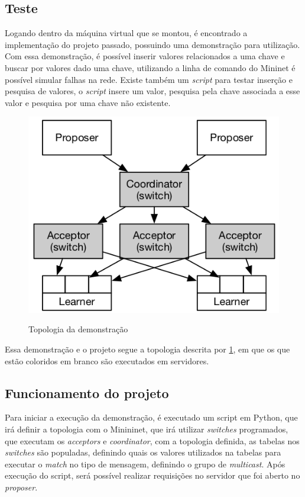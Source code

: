 \documentclass[
    12pt,
    openright, 
    oneside,
    a4paper,
    french,
    english,
    brazil
    ]{facom-ufu-abntex2}
\theoremstyle{definition}
\begin{document}
\subsection{Teste}

Logando dentro da máquina virtual que se montou, é encontrado a implementação do projeto
passado, possuindo uma demonstração para utilização. Com essa demonstração, é possível
inserir valores relacionados a uma chave e buscar por valores dado uma chave, utilizando
a linha de comando do Mininet é possível simular falhas na rede. Existe também um \emph{script}
para testar inserção e pesquisa de valores, o \emph{script} insere um valor, pesquisa pela chave
associada a esse valor e pesquisa por uma chave não existente.

\begin{figure}[ht]
    \caption{Topologia da demonstração \cite{dang2016paxos}}
    \centering
    \includegraphics[scale=0.8]{images/arq.png}
    \label{fig:demo-topo}
\end{figure}

Essa demonstração e o projeto segue a topologia descrita por \ref{fig:demo-topo}, em que os
que estão coloridos em branco são executados em servidores.

\subsection{Funcionamento do projeto}
Para iniciar a execução da demonstração, é executado um script em Python, que irá definir a
topologia com o Minininet, que irá utilizar \emph{switches} programados, que executam os \emph{acceptors}
e \emph{coordinator}, com a topologia definida, as tabelas nos \emph{switches} são populadas, definindo
quais os valores utilizados na tabelas para executar o \emph{match} no tipo de mensagem, definindo o
grupo de \emph{multicast}. Após execução do script, será possível realizar requisições no servidor
que foi aberto no \emph{proposer}.
\end{document}
